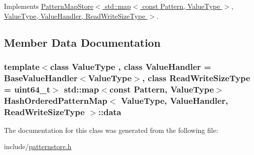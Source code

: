 Implements \hyperlink{classPatternMapStore_ab6dc590b4b102f1464301a3fc6c4ec73}{Pattern\+Map\+Store$<$ std\+::map$<$ const Pattern, Value\+Type $>$, Value\+Type, Value\+Handler, Read\+Write\+Size\+Type $>$}.



\subsection{Member Data Documentation}
\hypertarget{classHashOrderedPatternMap_adb4b3e32e897537d7bb1f5deaa650b7a}{}
\subsubsection[{data}]{\setlength{\rightskip}{0pt plus 5cm}template$<$class Value\+Type , class Value\+Handler  = Base\+Value\+Handler$<$\+Value\+Type$>$, class Read\+Write\+Size\+Type  = uint64\+\_\+t$>$ std\+::map$<$const {\bf Pattern}, Value\+Type$>$ {\bf Hash\+Ordered\+Pattern\+Map}$<$ Value\+Type, Value\+Handler, Read\+Write\+Size\+Type $>$\+::data\hspace{0.3cm}{\ttfamily [protected]}}\label{classHashOrderedPatternMap_adb4b3e32e897537d7bb1f5deaa650b7a}


The documentation for this class was generated from the following file\+:\begin{DoxyCompactItemize}
\item 
include/\hyperlink{patternstore_8h}{patternstore.\+h}\end{DoxyCompactItemize}

